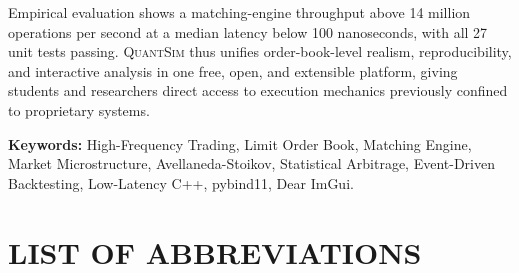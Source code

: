 \documentclass[12pt,oneside,a4paper]{report}
\newcommand{\quantsim}{\textsc{QuantSim}}
\begin{document}
Empirical evaluation shows a matching-engine throughput above 14 million operations per second at a median latency below 100 nanoseconds, with all 27 unit tests passing. \quantsim{} thus unifies order-book-level realism, reproducibility, and interactive analysis in one free, open, and extensible platform, giving students and researchers direct access to execution mechanics previously confined to proprietary systems.

\vspace{0.18in}
\noindent\textbf{Keywords:} High-Frequency Trading, Limit Order Book, Matching Engine, Market Microstructure, Avellaneda-Stoikov, Statistical Arbitrage, Event-Driven Backtesting, Low-Latency C++, pybind11, Dear ImGui.

\clearpage
\renewcommand{\contentsname}{TABLE OF CONTENTS}
\tableofcontents

\clearpage
\renewcommand{\listfigurename}{LIST OF FIGURES}
\listoffigures

\begingroup
\renewcommand{\clearpage}{}
\renewcommand{\listtablename}{LIST OF TABLES}
\listoftables
\endgroup

\begingroup
\renewcommand{\clearpage}{}
\chapter*{LIST OF ABBREVIATIONS}
\endgroup
\end{document}
